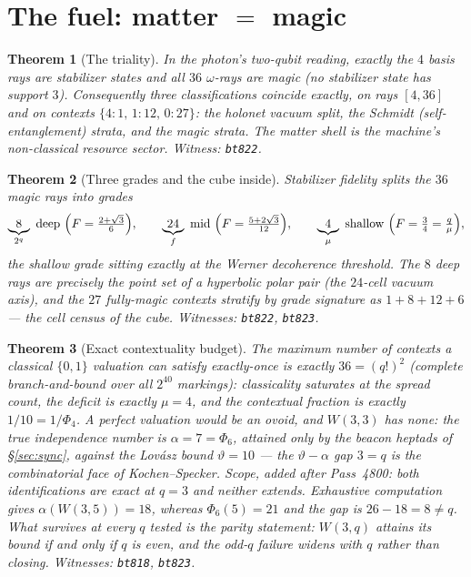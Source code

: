 \documentclass[11pt]{article}
\newtheorem{theorem}{Theorem}[section]
\newcommand{\W}{W(3,3)}
\begin{document}
\section[The fuel: matter equals magic]{The fuel: matter $=$ magic}
\label{sec:fuel}

\begin{theorem}[The triality]
In the photon's two-qubit reading, exactly the $4$ basis rays are
stabilizer states and all $36$ $\omega$-rays are magic (no stabilizer
state has support $3$).  Consequently three classifications coincide
exactly, on rays $[4,36]$ and on contexts $\{4{:}1,\,1{:}12,\,0{:}27\}$:
the holonet vacuum split, the Schmidt (self-entanglement) strata, and
the magic strata.  \emph{The matter shell is the machine's
non-classical resource sector.}
\emph{Witness: \texttt{bt822}.}
\end{theorem}

\begin{theorem}[Three grades and the cube inside]
Stabilizer fidelity splits the $36$ magic rays into grades
\[
\underbrace{8}_{2^q}\ \text{deep}\ \Bigl(F=\tfrac{2+\sqrt3}{6}\Bigr),
\qquad
\underbrace{24}_{f}\ \text{mid}\ \Bigl(F=\tfrac{5+2\sqrt3}{12}\Bigr),
\qquad
\underbrace{4}_{\mu}\ \text{shallow}\ \Bigl(F=\tfrac34=\tfrac q\mu\Bigr),
\]
the shallow grade sitting exactly at the Werner decoherence threshold.
The $8$ deep rays are precisely the point set of a hyperbolic polar
pair (the $24$-cell vacuum axis), and the $27$ fully-magic contexts
stratify by grade signature as $1+8+12+6$ --- the cell census of the
cube.  \emph{Witnesses: \texttt{bt822}, \texttt{bt823}.}
\end{theorem}

\begin{theorem}[Exact contextuality budget]
The maximum number of contexts a classical $\{0,1\}$ valuation can
satisfy exactly-once is exactly $36=(q!)^2$ (complete branch-and-bound
over all $2^{40}$ markings): classicality saturates at the spread
count, the deficit is exactly $\mu=4$, and the contextual fraction is
exactly $1/10=1/\Phi_4$.  A perfect valuation would be an ovoid, and
$\W$ has none: the true independence number is $\alpha=7=\Phi_6$,
attained only by the beacon heptads of \S\ref{sec:sync}, against the
Lov\'asz bound $\vartheta=10$ --- the $\vartheta-\alpha$ gap $3=q$ is
the combinatorial face of Kochen--Specker.
\emph{Scope, added after Pass~4800: both identifications are exact at $q=3$ and
neither extends. Exhaustive computation gives $\alpha(W(3,5))=18$, whereas
$\Phi_6(5)=21$ and the gap is $26-18=8\neq q$. What survives at every $q$ tested
is the parity statement: $W(3,q)$ attains its bound if and only if $q$ is even,
and the odd-$q$ failure widens with $q$ rather than closing.}
\emph{Witnesses: \texttt{bt818}, \texttt{bt823}.}
\end{theorem}
\end{document}

